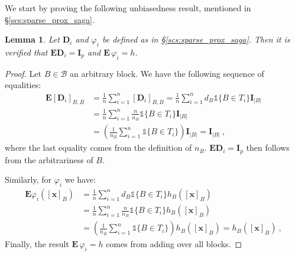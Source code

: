 \documentclass{article}
\newcommand{\Econd}{\mathbf{E}}
\def\xx{{\boldsymbol x}}
\def\DD{{\boldsymbol D}}
\newtheorem{lemma}{Lemma}
\renewcommand{\llbracket}{[}
\renewcommand{\rrbracket}{]}
\begin{document}
We start by proving the following unbiasedness result, mentioned in \S\ref{scs:sparse_prox_saga}.
\begin{lemma}\label{lemma:unbiasedness}
Let $\DD_i$ and $\varphi_i$ be defined as in \S\ref{scs:sparse_prox_saga}. Then it is verified that 
$\Econd \DD_i = \boldsymbol{I}_p$ and $\Econd\, \varphi_i = h$.
\end{lemma}
\begin{proof}
Let $B \in \mathcal{B}$ an arbitrary block. We have the following sequence of equalities:
\begin{align}
\Econd \llbracket\DD_i\rrbracket_{B, B} &= \frac{1}{n}\sum_{i=1}^n \llbracket\DD_i\rrbracket_{B, B} = \frac{1}{n}\sum_{i=1}^n d_B \mathds{1}\{B \in T_i\}\boldsymbol{I}_{|B|}\\
&=  \frac{1}{n}\sum_{i=1}^n \frac{n}{n_B} \mathds{1}\{B \in T_i\}\boldsymbol{I}_{|B|}\\
&= \left(\frac{1}{n_B} \sum_{i=1}^n \mathds{1}\{B \in T_i\}\right) \boldsymbol{I}_{|B|}= \boldsymbol{I}_{|B|}~,
\end{align}
where the last equality comes from the definition of $n_B$. $\Econd \DD_i = \boldsymbol{I}_p$ then follows from the arbitrariness of $B$.

Similarly, for $\varphi_i$ we have:
\begin{align}
\Econd \varphi_i(\llbracket\xx\rrbracket_B) &= \frac{1}{n}\sum_{i=1}^n d_B \mathds{1}\{B \in T_i\}h_B(\llbracket\xx\rrbracket_B)\\
&=  \frac{1}{n}\sum_{i=1}^n \frac{n}{n_B} \mathds{1}\{B \in T_i\}h_B(\llbracket\xx\rrbracket_B)\\
&= \left(\frac{1}{n_B} \sum_{i=1}^n \mathds{1}\{B \in T_i\}\right) h_B(\llbracket\xx\rrbracket_B)= h_B(\llbracket\xx\rrbracket_B)~,
\end{align}
Finally, the result $\Econd\, \varphi_i = h$ comes from adding over all blocks.
\end{proof}
\end{document}
